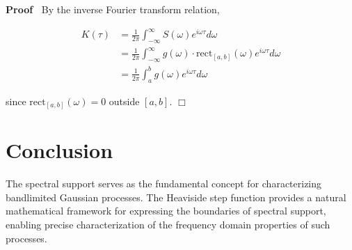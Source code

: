 \documentclass{article}
\newenvironment{proof}{\noindent\textbf{Proof\ }}{\hspace*{\fill}$\Box$\medskip}
\begin{document}
\begin{proof}
  By the inverse Fourier transform relation,
  
  \begin{align}
    K (\tau) & = \frac{1}{2 \pi}  \int_{- \infty}^{\infty} S (\omega) e^{i
    \omega \tau} d \omega \\
    & = \frac{1}{2 \pi}  \int_{- \infty}^{\infty} g (\omega) \cdot
    \mathrm{rect}_{[a, b]} (\omega) e^{i \omega \tau} d \omega \\
    & = \frac{1}{2 \pi}  \int_a^b g (\omega) e^{i \omega \tau} d \omega 
  \end{align}
  
  since $\mathrm{rect}_{[a, b]} (\omega) = 0$ outside $[a, b]$.
\end{proof}

\section{Conclusion}

The spectral support serves as the fundamental concept for characterizing
bandlimited Gaussian processes. The Heaviside step function provides a natural
mathematical framework for expressing the boundaries of spectral support,
enabling precise characterization of the frequency domain properties of such
processes.
\end{document}
